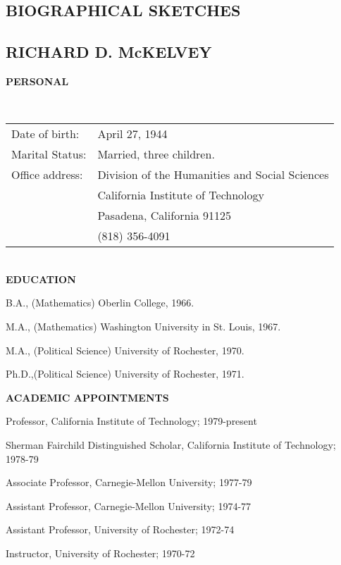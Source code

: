 \documentclass[12pt]{article}
\begin{document}
\newpage
\begin{center}
\section{BIOGRAPHICAL SKETCHES}
\end{center}
\subsection{RICHARD D. McKELVEY}

\noindent
{\bf PERSONAL} 

\ \\
\begin{tabular}{ll}
Date of birth:&April 27, 1944\\
Marital Status:&Married, three children.\\
Office address:&Division of the Humanities and Social Sciences \\
&California Institute of Technology \\
&Pasadena, California 91125 \\
&(818) 356-4091 \\
\end{tabular}

\ \\
\noindent
{\bf EDUCATION}
\begin{description}
\item
B.A., (Mathematics) Oberlin College, 1966.
\item
M.A., (Mathematics) Washington University in St. Louis, 1967.
\item
M.A., (Political Science) University of Rochester, 1970.
\item
Ph.D.,(Political Science) University of Rochester, 1971.
\end{description}

\noindent
{\bf ACADEMIC APPOINTMENTS}
\begin{description}
\item
Professor, California Institute of Technology; 1979-present 
\item
Sherman Fairchild Distinguished Scholar, California Institute of
Technology; 1978-79 
\item 
Associate Professor, Carnegie-Mellon University; 1977-79
\item
Assistant Professor, Carnegie-Mellon University; 1974-77
\item
Assistant Professor, University of Rochester; 1972-74 
\item
Instructor, University of Rochester; 1970-72
\end{description}
\end{document}
